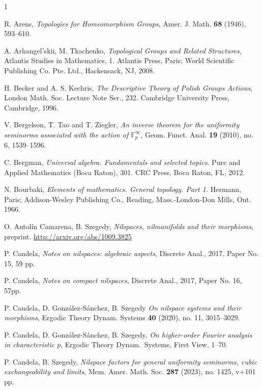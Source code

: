 \documentclass[a4paper,12pt,reqno]{amsart}
\theoremstyle{definition}
\newcommand{\mb}{\mathbb}
\begin{document}
\begin{thebibliography}{1}

 R. Arens, \emph{Topologies for Homeomorphism Groups},  Amer. J. Math. \textbf{68} (1946), 593--610.

 A. Arhangel'skii, M. Tkachenko, \emph{Topological Groups
and Related Structures}, Atlantis Studies in Mathematics, 1. Atlantis Press, Paris; World Scientific Publishing Co. Pte. Ltd., Hackensack, NJ, 2008.

 H. Becker and A. S. Kechris, \emph{The Descriptive Theory of Polish Groups Actions},
London Math. Soc. Lecture Note Ser., 232. Cambridge University Press, Cambridge, 1996.

 V. Bergelson, T. Tao and T. Ziegler, \emph{An inverse theorem for the uniformity seminorms associated with the action of $\mb{F}_p^{\infty}$}, Geom. Funct. Anal. \textbf{19} (2010), no. 6, 1539--1596.

 C. Bergman, \emph{Universal algebra. Fundamentals and selected topics}. Pure and Applied Mathematics (Boca Raton), 301. CRC Press, Boca Raton, FL, 2012.

 N. Bourbaki, \emph{Elements of mathematics. General topology. Part 1.} Hermann, Paris; Addison-Wesley Publishing Co., Reading, Mass.-London-Don Mills, Ont. 1966.

 O. Antolín Camarena, B. Szegedy, \emph{Nilspaces, nilmanifolds and their morphisms}, preprint. \url{http://arxiv.org/abs/1009.3825}

 P. Candela, \emph{Notes on nilspaces: algebraic aspects}, Discrete Anal., 2017, Paper No. 15, 59 pp.

 P. Candela, \emph{Notes on compact nilspaces}, Discrete Anal., 2017, Paper No. 16, 57pp.

 P. Candela, D. Gonz\'alez-S\'anchez, B. Szegedy \emph{On nilspace systems and their morphisms}, Ergodic Theory Dynam. Systems \textbf{40} (2020), no. 11, 3015--3029.

 P. Candela, D. Gonz\'alez-S\'anchez, B. Szegedy, \emph{On higher-order Fourier analysis in characteristic $p$}, Ergodic Theory Dynam.\ Systems, First View, 1--70.

 P. Candela, B. Szegedy, \emph{Nilspace factors for general uniformity seminorms, cubic exchangeability and limits}, Mem. Amer. Math. Soc. \textbf{287} (2023), no. 1425, v+101 pp.


\end{thebibliography}
\end{document}
